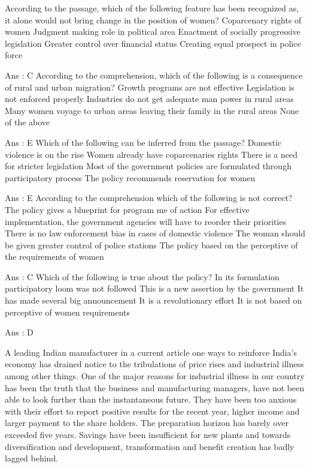     According to the passage, which of the following feature has been recognized as, it alone would not bring change in the position of women?
        Coparcenary rights of women
        Judgment making role in political area
        Enactment of socially progressive legislation
        Greater control over financial status
        Creating equal prospect in police force 

    Ans : C
    According to the comprehension, which of the following is a consequence of rural and urban migration?
        Growth programs are not effective
        Legislation is not enforced properly
        Industries do not get adequate man power in rural areas
        Many women voyage to urban areas leaving their family in the rural areas
        None of the above 

    Ans : E
    Which of the following can be inferred from the passage?
        Domestic violence is on the rise
        Women already have coparcenaries rights
        There is a need for stricter legislation
        Most of the government policies are formulated through participatory process
        The policy recommends reservation for women 

    Ans : E
    According to the comprehension which of the following is not correct?
        The policy gives a blueprint for program me of action
        For effective implementation, the government agencies will have to reorder their priorities
        There is no law enforcement bias in cases of domestic violence
        The woman should be given greater control of police stations
        The policy based on the perceptive of the requirements of women 

    Ans : C
    Which of the following is true about the policy?
        In its formulation participatory loom was not followed
        This is a new assertion by the government
        It has made several big announcement
        It is a revolutionary effort
        It is not based on perceptive of women requirements 

    Ans : D 



A leading Indian manufacturer in a current article one ways to reinforce India’s economy has drained notice to the tribulations of price rises and industrial illness among other things. One of the major reasons for industrial illness in our country has been the truth that the business and manufacturing managers, have not been able to look further than the instantaneous future. They have been too anxious with their effort to report positive results for the recent year, higher income and larger payment to the share holders. The preparation horizon has barely over exceeded five years. Savings have been insufficient for new plants and towards diversification and development, transformation and benefit creation has badly lagged behind.

